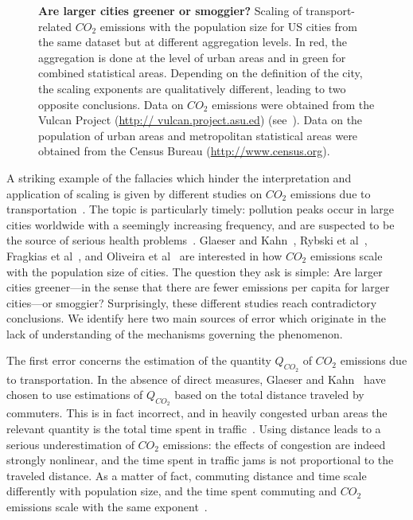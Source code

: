 \begin{figure}[!h]
	\centering
	\caption{ {\bf Are larger cities greener or smoggier?} Scaling of transport-related $CO_2$
emissions with the population size for US cities from the same dataset but at different aggregation
levels. In red, the aggregation is done at the level of urban areas and in green for combined statistical
areas. Depending on the definition of the city, the scaling exponents are qualitatively different, leading
to two opposite conclusions. Data on $CO_2$ emissions were obtained from the Vulcan Project (\url{http://
vulcan.project.asu.ed}) (see~\cite{Fragkias:2013,Oliveira:2014}). Data on the population of urban areas and
metropolitan statistical areas were obtained from the Census Bureau (\protect\url{http://www.census.org}). \label{fig}}
\end{figure}


A striking example of the fallacies which hinder the interpretation and application
of scaling is given by different studies on $CO_2$ emissions due to transportation~\cite{Fragkias:2013,Glaeser:2010,Oliveira:2014,Rybski:2013}. The topic
is particularly timely: pollution peaks occur in large cities worldwide with a seemingly
increasing frequency, and are suspected to be the source of serious health problems~\cite{Bernstein:2004}. Glaeser and Kahn~\cite{Glaeser:2010}, Rybski et al~\cite{Rybski:2013}, Fragkias et al~\cite{Fragkias:2013}, and Oliveira et al~\cite{Oliveira:2014} are interested in how $CO_2$ emissions scale with the population size
of cities. The question they ask is simple: Are larger cities greener---in the sense that there
are fewer emissions per capita for larger cities---or smoggier? Surprisingly, these different
studies reach contradictory conclusions. We identify here two main sources of error which
originate in the lack of understanding of the mechanisms governing the phenomenon.

The first error concerns the estimation of the quantity $Q_{CO_2}$ of $CO_2$ emissions due to
transportation. In the absence of direct measures, Glaeser and Kahn~\cite{Glaeser:2010} have chosen
to use estimations of $Q_{CO_2}$ based on the total distance traveled by commuters. This is in fact
incorrect, and in heavily congested urban areas the relevant quantity is the total time spent
in traffic~\cite{Louf:2013}. Using distance leads to a serious underestimation of
$CO_2$ emissions: the effects of congestion are indeed strongly nonlinear, and the time spent
in traffic jams is not proportional to the traveled distance. As a matter of fact, commuting
distance and time scale differently with population size, and the time spent commuting and
$CO_2$ emissions scale with the same exponent~\cite{Louf:2014}.

